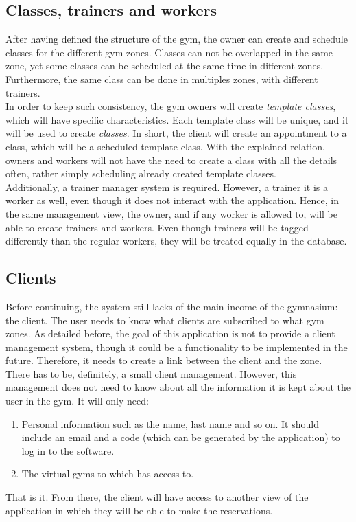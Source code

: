 \documentclass[a4paper, 12pt, oneside]{book}
\begin{document}
\subsection{Classes, trainers and workers}
After having defined the structure of the gym, the owner can create and schedule classes for the different gym zones. Classes can not be overlapped in the same zone, yet some classes can be scheduled at the same time in different zones. Furthermore, the same class can be done in multiples zones, with different trainers.
\\[8pt]
In order to keep such consistency, the gym owners will create \emph{template classes}, which will have specific characteristics. Each template class will be unique, and it will be used to create \emph{classes}. In short, the client will create an appointment to a class, which will be a scheduled template class. With the explained relation, owners and workers will not have the need to create a class with all the details often, rather simply scheduling already created template classes.
\\[8pt]
Additionally, a trainer manager system is required. However, a trainer it is a worker as well, even though it does not interact with the application. Hence, in the same management view, the owner, and if any worker is allowed to, will be able to create trainers and workers. Even though trainers will be tagged differently than the regular workers, they will be treated equally in the database.
\subsection{Clients}
Before continuing, the system still lacks of the main income of the gymnasium: the client. The user needs to know what clients are subscribed to what gym zones. As detailed before, the goal of this application is not to provide a client management system, though it could be a functionality to be implemented in the future. Therefore, it needs to create a link between the client and the zone.
\\[8pt]
There has to be, definitely, a small client management. However, this management does not need to know about all the information it is kept about the user in the gym. It will only need:
\begin{enumerate}[label = -]
	\item Personal information such as the name, last name and so on. It should include an email and a code (which can be generated by the application) to log in to the software.
	\item The virtual gyms to which has access to.
\end{enumerate}
That is it. From there, the client will have access to another view of the application in which they will be able to make the reservations.
\end{document}
